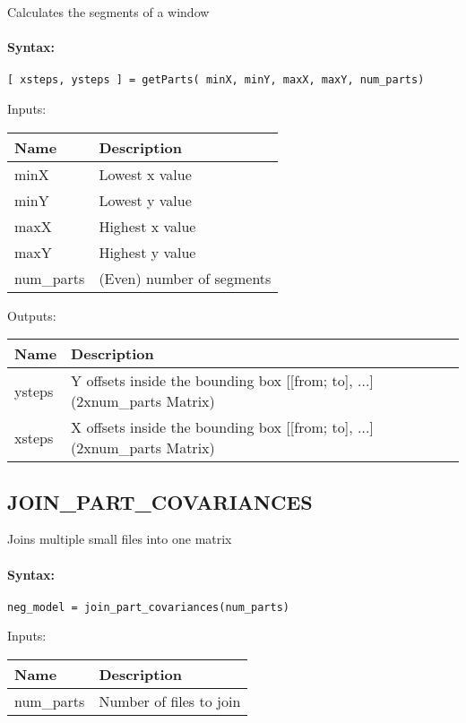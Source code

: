 Calculates the segments of a window

\paragraph{Syntax:} \verb|[ xsteps, ysteps ] = getParts( minX, minY, maxX, maxY, num_parts)|

\bigskip
Inputs:

\begin{tabular}{|p{}|p{}|}
\hline
\textbf{Name} & \textbf{Description} \\
\hline \hline
minX & Lowest x value  \\ \hline
minY & Lowest y value  \\ \hline
maxX & Highest x value  \\ \hline
maxY & Highest y value  \\ \hline
num\_parts & (Even) number of segments  \\ \hline
\end{tabular}

\bigskip
Outputs:

\begin{tabular}{|p{}|p{}|}
\hline
\textbf{Name} & \textbf{Description} \\
\hline \hline
ysteps & Y offsets inside the bounding box [[from; to], ...] (2xnum\_parts Matrix)  \\ \hline
xsteps & X offsets inside the bounding box [[from; to], ...] (2xnum\_parts Matrix)  \\ \hline
\end{tabular}

\subsection{JOIN\_PART\_COVARIANCES}

Joins multiple small files into one matrix

\paragraph{Syntax:} \verb|neg_model = join_part_covariances(num_parts)|

\bigskip
Inputs:

\begin{tabular}{|p{}|p{}|}
\hline
\textbf{Name} & \textbf{Description} \\
\hline \hline
num\_parts & Number of files to join  \\ \hline
\end{tabular}

